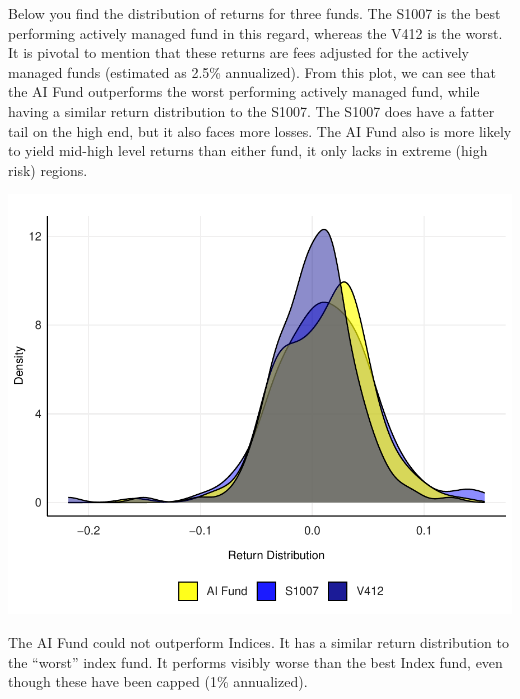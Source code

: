 \documentclass[11pt,preprint, authoryear]{elsarticle}
\let\origfigure\figure
\let\endorigfigure\endfigure
\renewenvironment{figure}[1][2] {
    \expandafter\origfigure\expandafter[H]
} {
    \endorigfigure
}
\numberwithin{equation}{section}
\numberwithin{figure}{section}
\numberwithin{table}{section}
\begin{document}
Below you find the distribution of returns for three funds. The S1007 is
the best performing actively managed fund in this regard, whereas the
V412 is the worst. It is pivotal to mention that these returns are fees
adjusted for the actively managed funds (estimated as 2.5\% annualized).
From this plot, we can see that the AI Fund outperforms the worst
performing actively managed fund, while having a similar return
distribution to the S1007. The S1007 does have a fatter tail on the high
end, but it also faces more losses. The AI Fund also is more likely to
yield mid-high level returns than either fund, it only lacks in extreme
(high risk) regions.

\begin{figure}[H]

{\centering \includegraphics{Question-1_files/figure-latex/unnamed-chunk-1-1} 

}

\caption{ \label{Figure1.1}}\label{fig:unnamed-chunk-1}
\end{figure}

The AI Fund could not outperform Indices. It has a similar return
distribution to the ``worst'' index fund. It performs visibly worse than
the best Index fund, even though these have been capped (1\%
annualized).
\end{document}
